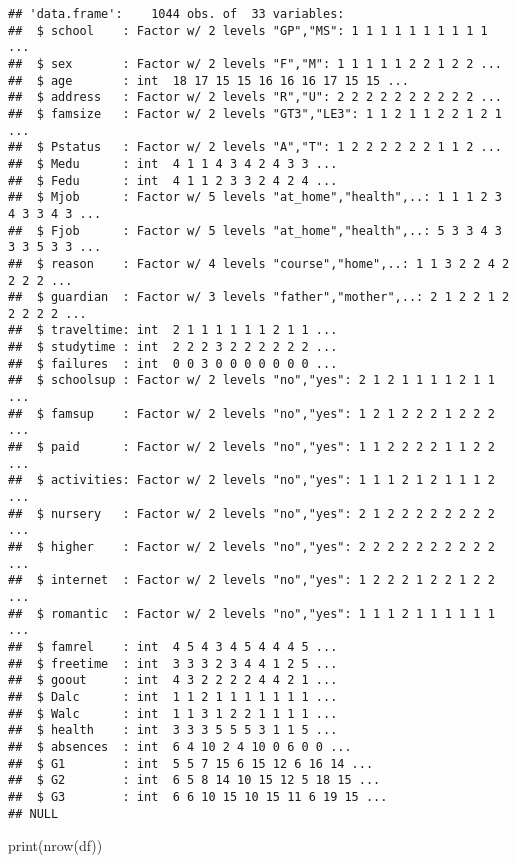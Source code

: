 \documentclass[
]{article}
\newenvironment{Shaded}{\begin{snugshade}}{\end{snugshade}}
\newcommand{\FunctionTok}[1]{\textcolor[rgb]{0.00,0.00,0.00}{#1}}
\newcommand{\NormalTok}[1]{#1}
\begin{document}
\begin{verbatim}
## 'data.frame':    1044 obs. of  33 variables:
##  $ school    : Factor w/ 2 levels "GP","MS": 1 1 1 1 1 1 1 1 1 1 ...
##  $ sex       : Factor w/ 2 levels "F","M": 1 1 1 1 1 2 2 1 2 2 ...
##  $ age       : int  18 17 15 15 16 16 16 17 15 15 ...
##  $ address   : Factor w/ 2 levels "R","U": 2 2 2 2 2 2 2 2 2 2 ...
##  $ famsize   : Factor w/ 2 levels "GT3","LE3": 1 1 2 1 1 2 2 1 2 1 ...
##  $ Pstatus   : Factor w/ 2 levels "A","T": 1 2 2 2 2 2 2 1 1 2 ...
##  $ Medu      : int  4 1 1 4 3 4 2 4 3 3 ...
##  $ Fedu      : int  4 1 1 2 3 3 2 4 2 4 ...
##  $ Mjob      : Factor w/ 5 levels "at_home","health",..: 1 1 1 2 3 4 3 3 4 3 ...
##  $ Fjob      : Factor w/ 5 levels "at_home","health",..: 5 3 3 4 3 3 3 5 3 3 ...
##  $ reason    : Factor w/ 4 levels "course","home",..: 1 1 3 2 2 4 2 2 2 2 ...
##  $ guardian  : Factor w/ 3 levels "father","mother",..: 2 1 2 2 1 2 2 2 2 2 ...
##  $ traveltime: int  2 1 1 1 1 1 1 2 1 1 ...
##  $ studytime : int  2 2 2 3 2 2 2 2 2 2 ...
##  $ failures  : int  0 0 3 0 0 0 0 0 0 0 ...
##  $ schoolsup : Factor w/ 2 levels "no","yes": 2 1 2 1 1 1 1 2 1 1 ...
##  $ famsup    : Factor w/ 2 levels "no","yes": 1 2 1 2 2 2 1 2 2 2 ...
##  $ paid      : Factor w/ 2 levels "no","yes": 1 1 2 2 2 2 1 1 2 2 ...
##  $ activities: Factor w/ 2 levels "no","yes": 1 1 1 2 1 2 1 1 1 2 ...
##  $ nursery   : Factor w/ 2 levels "no","yes": 2 1 2 2 2 2 2 2 2 2 ...
##  $ higher    : Factor w/ 2 levels "no","yes": 2 2 2 2 2 2 2 2 2 2 ...
##  $ internet  : Factor w/ 2 levels "no","yes": 1 2 2 2 1 2 2 1 2 2 ...
##  $ romantic  : Factor w/ 2 levels "no","yes": 1 1 1 2 1 1 1 1 1 1 ...
##  $ famrel    : int  4 5 4 3 4 5 4 4 4 5 ...
##  $ freetime  : int  3 3 3 2 3 4 4 1 2 5 ...
##  $ goout     : int  4 3 2 2 2 2 4 4 2 1 ...
##  $ Dalc      : int  1 1 2 1 1 1 1 1 1 1 ...
##  $ Walc      : int  1 1 3 1 2 2 1 1 1 1 ...
##  $ health    : int  3 3 3 5 5 5 3 1 1 5 ...
##  $ absences  : int  6 4 10 2 4 10 0 6 0 0 ...
##  $ G1        : int  5 5 7 15 6 15 12 6 16 14 ...
##  $ G2        : int  6 5 8 14 10 15 12 5 18 15 ...
##  $ G3        : int  6 6 10 15 10 15 11 6 19 15 ...
## NULL
\end{verbatim}

\begin{Shaded}
\begin{Highlighting}[]
\FunctionTok{print}\NormalTok{(}\FunctionTok{nrow}\NormalTok{(df))}
\end{Highlighting}
\end{Shaded}
\end{document}
